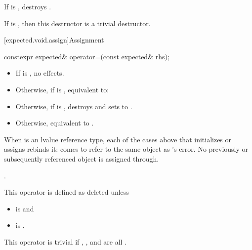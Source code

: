 \begin{itemdescr}
\pnum
\effects
If  is , destroys .

\pnum
\remarks
If  is ,
then this destructor is a trivial destructor.
\end{itemdescr}

[expected.void.assign]{Assignment}

%
\begin{itemdecl}
constexpr expected& operator=(const expected& rhs);
\end{itemdecl}

\begin{itemdescr}
\pnum
\effects
\begin{itemize}
\item
If  is , no effects.
\item
Otherwise, if  is ,
equivalent to: 
\item
Otherwise, if  is ,
destroys  and sets  to .
\item
Otherwise, equivalent to .
\end{itemize}

\begin{addedblock}
\pnum
When  is an lvalue reference type, each of the cases above that
initializes or assigns  rebinds it:  comes to
refer to the same object as 's error. No previously or
subsequently referenced object is assigned through.
\end{addedblock}

\pnum
\returns
{}.

\pnum
\remarks
This operator is defined as deleted unless
\begin{itemize}
\item
{} is  and
\item
{} is .
\end{itemize}

\pnum
This operator is trivial if
,
, and
are all .
\end{itemdescr}

